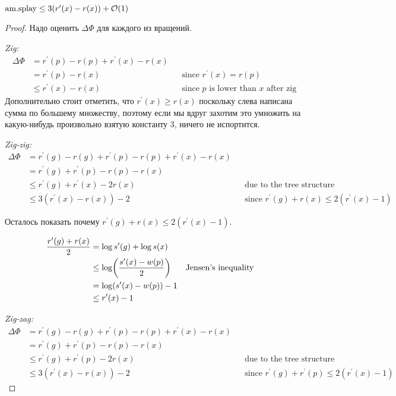 \begin{theorem}
	$\text{am.splay} \leq 3(r^\prime(x) - r(x)) + \mathcal{O}(1)$
\end{theorem}
\begin{proof}
	Надо оценить $\Delta\Phi$ для каждого из вращений.

	{\it Zig:}
	\begin{align*}
		\Delta\Phi & = r^\prime(p) - r(p) + r^\prime(x) - r(x) \\
		& = r^\prime(p) - r(x) && \text{since $r^\prime(x) = r(p)$} \\
		& \leq r^\prime(x) - r(x) && \text{since $p$ is lower than $x$ after zig}
	\end{align*}
	Дополнительно стоит отметить, что $r^\prime(x) \geq r(x)$ поскольку слева написана сумма по большему множеству, поэтому если мы вдруг захотим это умножить на какую-нибудь произвольно взятую константу $3$, ничего не испортится.

	{\it Zig-zig:}
	\begin{align*}
		\Delta\Phi & = r^\prime(g) - r(g) + r^\prime(p) - r(p) + r^\prime(x) - r(x) \\
		& = r^\prime(g) + r^\prime(p) - r(p) - r(x) \\
		& \leq r^\prime(g) + r^\prime(x) - 2 r(x) && \text{due to the tree structure} \\
		& \leq 3 (r^\prime(x) - r(x)) - 2 && \text{since $r^\prime(g) + r(x) \leq 2(r^\prime(x) - 1)$}
	\end{align*}

	Осталось показать почему $r^\prime(g) + r(x) \leq 2(r^\prime(x) - 1)$.

	\begin{align*}
		\frac{r^\prime(g) + r(x)}{2} & = \log s^\prime(g) + \log s(x) \\
		& \leq \log \parens*{ \frac{s^\prime(x) - w(p)}{2} } && \text{Jensen's inequality} \\
		& = \log \parens*{s^\prime (x) - w(p)} - 1 \\
		& \leq r^\prime(x) - 1
	\end{align*}

	{\it Zig-zag:}
	\begin{align*}
		\Delta\Phi & = r^\prime(g) - r(g) + r^\prime(p) - r(p) + r^\prime(x) - r(x) \\
		& = r^\prime(g) + r^\prime(p) - r(p) - r(x) \\
		& \leq r^\prime(g) + r^\prime(p) - 2 r(x) && \text{due to the tree structure} \\
		& \leq 3 (r^\prime(x) - r(x)) - 2 && \text{since $r^\prime(g) + r^\prime(p) \leq 2(r^\prime(x) - 1)$}
	\end{align*}


\end{proof}
